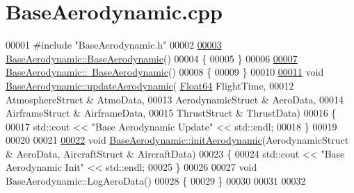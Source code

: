 \hypertarget{_base_aerodynamic_8cpp_source}{}\section{Base\+Aerodynamic.\+cpp}
\label{_base_aerodynamic_8cpp_source}

\begin{DoxyCode}
00001 \textcolor{preprocessor}{#include "BaseAerodynamic.h"}
00002 
\hyperlink{group___aerodynamic_aa05d0598119b1364cdb45cf478ae578c}{00003} \hyperlink{group___aerodynamic_aa05d0598119b1364cdb45cf478ae578c}{BaseAerodynamic::BaseAerodynamic}()
00004 \{
00005 \}
00006 
\hyperlink{group___aerodynamic_a81d08f3a779e6e25245b6f3b545920cb}{00007} \hyperlink{group___aerodynamic_a81d08f3a779e6e25245b6f3b545920cb}{BaseAerodynamic::~BaseAerodynamic}()
00008 \{
00009 \}
00010 
\hyperlink{group___aerodynamic_a6354f3c8433c7a2235041f843d4fe10e}{00011} \textcolor{keywordtype}{void} \hyperlink{group___aerodynamic_a6354f3c8433c7a2235041f843d4fe10e}{BaseAerodynamic::updateAerodynamic}(
      \hyperlink{group___tools_ga3f1431cb9f76da10f59246d1d743dc2c}{Float64} FlightTime, 
00012                                         AtmosphereStruct & AtmoData, 
00013                                         AerodynamicStruct & AeroData, 
00014                                         AirframeStruct & AirframeData, 
00015                                         ThrustStruct & ThrustData)
00016 \{
00017     std::cout << \textcolor{stringliteral}{"Base Aerodynamic Update"} << std::endl;
00018 \}
00019 
00020 
00021 
\hyperlink{group___aerodynamic_a5ea58755a40507d217848efb151879c8}{00022} \textcolor{keywordtype}{void} \hyperlink{group___aerodynamic_a5ea58755a40507d217848efb151879c8}{BaseAerodynamic::initAerodynamic}(AerodynamicStruct & AeroData, 
      AircraftStruct & AircraftData)
00023 \{
00024     std::cout << \textcolor{stringliteral}{"Base Aerodynamic Init"} << std::endl;
00025 \}
00026 
00027 \textcolor{keywordtype}{void} BaseAerodynamic::LogAeroData()
00028 \{
00029 \}
00030 
00031 
00032 
\end{DoxyCode}
